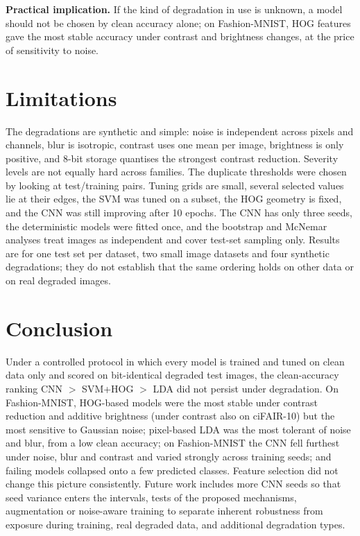 \documentclass[conference]{IEEEtran}
\begin{document}
\textbf{Practical implication.} If the kind of degradation in use is unknown, a model should not be chosen by clean accuracy alone; on Fashion-MNIST, HOG features gave the most stable accuracy under contrast and brightness changes, at the price of sensitivity to noise.

\section{Limitations}
The degradations are synthetic and simple: noise is independent across pixels and channels, blur is isotropic, contrast uses one mean per image, brightness is only positive, and 8-bit storage quantises the strongest contrast reduction.
Severity levels are not equally hard across families. The duplicate thresholds were chosen by looking at test/training pairs. Tuning grids are small, several selected values lie at their edges, the SVM was tuned on a subset, the HOG geometry is fixed,
and the CNN was still improving after 10 epochs. The CNN has only three seeds, the deterministic models were fitted once, and the bootstrap and McNemar analyses treat images as independent and cover test-set sampling only. Results are for one
test set per dataset, two small image datasets and four synthetic degradations; they do not establish that the same ordering holds on other data or on real degraded images.

\section{Conclusion}
Under a controlled protocol in which every model is trained and tuned on clean data only and scored on bit-identical degraded test images, the clean-accuracy ranking CNN $>$ SVM+HOG $>$ LDA did not persist under degradation. On Fashion-MNIST, HOG-based models were the most stable under
contrast reduction and additive brightness (under contrast also on ciFAIR-10) but the most sensitive to Gaussian noise; pixel-based LDA was the most tolerant of noise and blur, from a low clean accuracy; on Fashion-MNIST the CNN fell furthest under noise, blur and contrast and varied strongly
across training seeds; and failing models collapsed onto a few predicted classes. Feature selection did not change this picture consistently. Future work includes more CNN seeds so that seed variance enters the intervals, tests of the proposed mechanisms,
augmentation or noise-aware training to separate inherent robustness from exposure during training, real degraded data, and additional degradation types.



\end{document}
